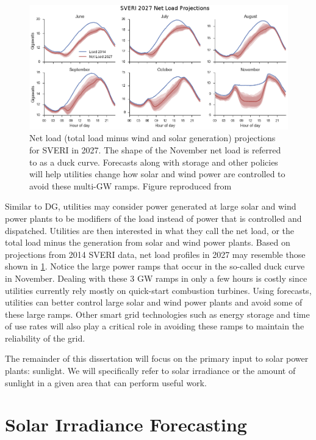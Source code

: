 \begin{figure}[tbh]
\centering
\includegraphics[width=\textwidth]{figs/duckcurves.png}
\caption[Projected SVERI 2027 duck curves]{Net load (total load minus
wind and solar generation) projections for SVERI in 2027. The shape of
the November net load is referred to as a duck curve. Forecasts along
with storage and other policies will help utilities change how solar
and wind power are controlled to avoid these multi-GW ramps. Figure
reproduced from \cite{sveri_report}}
\label{fig:duckcurves}
\end{figure}

Similar to DG, utilities may consider power generated at large solar
and wind power plants to be modifiers of the load instead of power
that is controlled and dispatched.
Utilities are then interested in what they call the net load, or the
total load minus the generation from solar and wind power plants.
Based on projections from 2014 SVERI data, net load profiles in 2027
may resemble those shown in \cref{fig:duckcurves}.
Notice the large power ramps that occur in the so-called duck curve in
November.
Dealing with these 3 GW ramps in only a few hours is costly since
utilities currently rely mostly on quick-start combustion turbines.
Using forecasts, utilities can better control large solar and wind
power plants and avoid some of these large ramps.
Other smart grid technologies such as energy storage and time of use
rates will also play a critical role in avoiding these ramps to
maintain the reliability of the grid.

The remainder of this dissertation will focus on the primary input to
solar power plants: sunlight.
We will specifically refer to solar irradiance or the amount of
sunlight in a given area that can perform useful work.

\section{Solar Irradiance Forecasting}
\label{sec:genfx}

